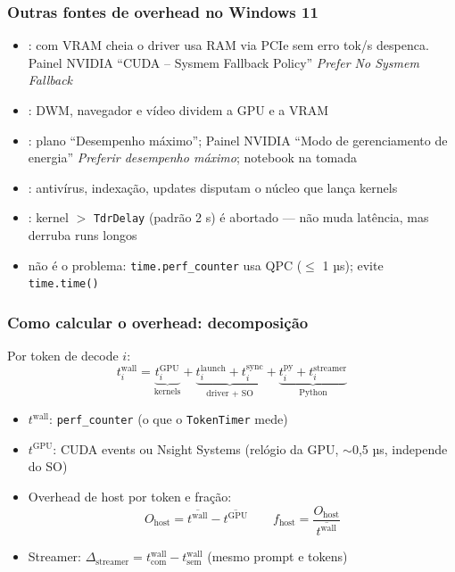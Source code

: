 \documentclass[11pt, aspectratio=169, usepdftitle=false]{beamer}
\begin{document}
\begin{frame}
\frametitle{Outras fontes de overhead no Windows 11}
\begin{itemize}
\item {}: com VRAM cheia o driver usa RAM via PCIe sem erro \so tok/s despenca. Painel NVIDIA \so ``CUDA -- Sysmem Fallback Policy'' \so \emph{Prefer No Sysmem Fallback}
\item {}: DWM, navegador e vídeo dividem a GPU e a VRAM
\item {}: plano ``Desempenho máximo''; Painel NVIDIA \so ``Modo de gerenciamento de energia'' \so \emph{Preferir desempenho máximo}; notebook na tomada
\item {}: antivírus, indexação, updates disputam o núcleo que lança kernels
\item {}: kernel $>$ \texttt{TdrDelay} (padrão 2 s) é abortado --- não muda latência, mas derruba runs longos
\item {} não é o problema: \texttt{time.perf\_counter} usa QPC ($\le$ 1 µs); evite \texttt{time.time()}
\end{itemize}
\end{frame}

\begin{frame}
\frametitle{Como calcular o overhead: decomposição}
Por token de decode $i$:
\[ t_i^{\text{wall}} = \underbrace{t_i^{\text{GPU}}}_{\text{kernels}} + \underbrace{t_i^{\text{launch}} + t_i^{\text{sync}}}_{\text{driver + SO}} + \underbrace{t_i^{\text{py}} + t_i^{\text{streamer}}}_{\text{Python}} \]
\begin{itemize}
\item $t^{\text{wall}}$: \texttt{perf\_counter} (o que o \texttt{TokenTimer} mede)
\item $t^{\text{GPU}}$: CUDA events ou Nsight Systems (relógio da GPU, $\sim$0,5 µs, independe do SO)
\item Overhead de host por token e fração:
\[ O_{\text{host}} = \overline{t^{\text{wall}}} - \overline{t^{\text{GPU}}} \qquad f_{\text{host}} = \frac{O_{\text{host}}}{\overline{t^{\text{wall}}}} \]
\item Streamer: $\Delta_{\text{streamer}} = t^{\text{wall}}_{\text{com}} - t^{\text{wall}}_{\text{sem}}$ (mesmo prompt e tokens)
\end{itemize}
\end{frame}
\end{document}
